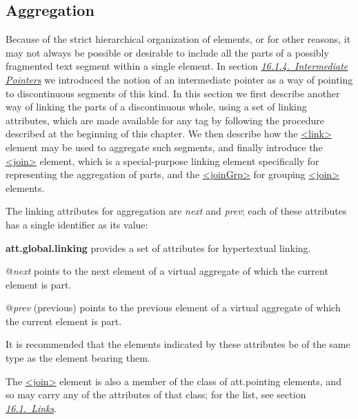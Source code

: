 \subsection[{Aggregation}]{Aggregation}\label{SAAG}\par
Because of the strict hierarchical organization of elements, or for other reasons, it may not always be possible or desirable to include all the parts of a possibly fragmented text segment within a single element. In section \textit{\hyperref[SAPTIP]{16.1.4.\ Intermediate Pointers}} we introduced the notion of an intermediate pointer as a way of pointing to discontinuous segments of this kind. In this section we first describe another way of linking the parts of a discontinuous whole, using a set of linking attributes, which are made available for any tag by following the procedure described at the beginning of this chapter. We then describe how the \hyperref[TEI.link]{<link>} element may be used to aggregate such segments, and finally introduce the \hyperref[TEI.join]{<join>} element, which is a special-purpose linking element specifically for representing the aggregation of parts, and the \hyperref[TEI.joinGrp]{<joinGrp>} for grouping \hyperref[TEI.join]{<join>} elements.\par
The linking attributes for aggregation are {\itshape next} and {\itshape prev}; each of these attributes has a single identifier as its value: 
\begin{sansreflist}
  
\item [\textbf{att.global.linking}] provides a set of attributes for hypertextual linking.\hfil\\[-10pt]\begin{sansreflist}
    \item[@{\itshape next}]
  points to the next element of a virtual aggregate of which the current element is part.
    \item[@{\itshape prev}]
  (previous) points to the previous element of a virtual aggregate of which the current element is part.
\end{sansreflist}  
\end{sansreflist}
\par
It is recommended that the elements indicated by these attributes be of the same type as the element bearing them.\par
The \hyperref[TEI.join]{<join>} element is also a member of the class of \textsf{att.pointing} elements, and so may carry any of the attributes of that class; for the list, see section \textit{\hyperref[SAPT]{16.1.\ Links}}.\par

